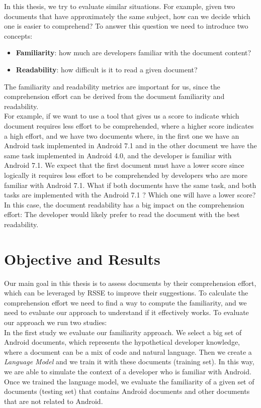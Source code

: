 \documentclass[12pt,mscthesis]{usiinfthesis}
\begin{document}
	In this thesis, we try to evaluate similar situations. For example, given two documents that have approximately the same subject, how can we decide which one is easier to comprehend? To answer this question we need to introduce two concepts:
	\begin{itemize}
	\item \textbf{Familiarity}: how much are developers familiar with the document content?
	\item \textbf{Readability}: how difficult is it to read a given document?
	\end{itemize}
	The familiarity and readability metrics are important for us, since the comprehension effort can be derived from the document familiarity and readability.\\
	For example, if we want to use a tool that gives us a score to indicate which document requires less effort to be comprehended, where a higher score indicates a high effort, and we have two documents where, in the first one we have an Android task implemented in Android 7.1 and in the other document we have the same task implemented in Android 4.0, and the developer is familiar with Android 7.1.
	We expect that the first document must have a lower score since logically it requires less effort to be comprehended by developers who are more familiar with Android 7.1.
	What if both documents have the same task, and both tasks are implemented with the Android 7.1 ? Which one will have a lower score? 
	In this case, the document readability has a big impact on the comprehension effort: The developer would likely prefer to read the document with the best readability.\\
	
	\section{Objective and Results}
	Our main goal in this thesis is to assess documents by their comprehension effort, which can be leveraged by RSSE to improve their suggestions.
	To calculate the comprehension effort we need to find a way to compute the familiarity, and we need to evaluate our approach to understand if it effectively works.
	To evaluate our approach we run two studies:\\

	 In the first study we evaluate our familiarity approach. We select a big set of Android documents, which represents the hypothetical developer knowledge, where a document can be a mix of code and natural language. Then we create a \emph{ Language Model} \cite{Hindle:2012:NS:2337223.2337322} and we train it with these documents (training set). In this way, we are able to simulate the context of a developer who is familiar with Android. Once we trained the language model, we evaluate the familiarity of a given set of documents (testing set) that contains Android documents and other documents that are not related to Android.
\end{document}
